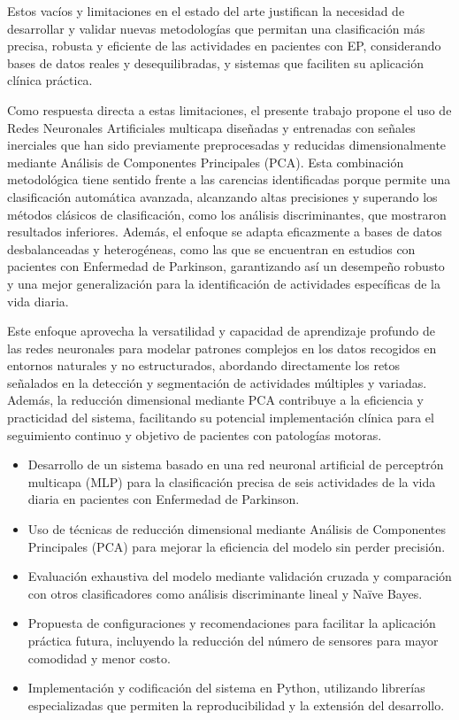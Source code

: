 \documentclass[journal]{IEEEtran}
\begin{document}
Estos vacíos y limitaciones en el estado del arte justifican la necesidad de desarrollar y validar nuevas metodologías que permitan una clasificación más precisa, robusta y eficiente de las actividades en pacientes con EP, considerando bases de datos reales y desequilibradas, y sistemas que faciliten su aplicación clínica práctica.

Como respuesta directa a estas limitaciones, el presente trabajo propone el uso de Redes Neuronales Artificiales multicapa diseñadas y entrenadas con señales inerciales que han sido previamente preprocesadas y reducidas dimensionalmente mediante Análisis de Componentes Principales (PCA). Esta combinación metodológica tiene sentido frente a las carencias identificadas porque permite una clasificación automática avanzada, alcanzando altas precisiones y superando los métodos clásicos de clasificación, como los análisis discriminantes, que mostraron resultados inferiores. Además, el enfoque se adapta eficazmente a bases de datos desbalanceadas y heterogéneas, como las que se encuentran en estudios con pacientes con Enfermedad de Parkinson, garantizando así un desempeño robusto y una mejor generalización para la identificación de actividades específicas de la vida diaria.

Este enfoque aprovecha la versatilidad y capacidad de aprendizaje profundo de las redes neuronales para modelar patrones complejos en los datos recogidos en entornos naturales y no estructurados, abordando directamente los retos señalados en la detección y segmentación de actividades múltiples y variadas. Además, la reducción dimensional mediante PCA contribuye a la eficiencia y practicidad del sistema, facilitando su potencial implementación clínica para el seguimiento continuo y objetivo de pacientes con patologías motoras.

\begin{itemize}
  \item Desarrollo de un sistema basado en una red neuronal artificial de perceptrón multicapa (MLP) para la clasificación precisa de seis actividades de la vida diaria en pacientes con Enfermedad de Parkinson.
  \item Uso de técnicas de reducción dimensional mediante Análisis de Componentes Principales (PCA) para mejorar la eficiencia del modelo sin perder precisión.
  \item Evaluación exhaustiva del modelo mediante validación cruzada y comparación con otros clasificadores como análisis discriminante lineal y Naïve Bayes.
  \item Propuesta de configuraciones y recomendaciones para facilitar la aplicación práctica futura, incluyendo la reducción del número de sensores para mayor comodidad y menor costo.
  \item Implementación y codificación del sistema en Python, utilizando librerías especializadas que permiten la reproducibilidad y la extensión del desarrollo.
\end{itemize}
\end{document}
